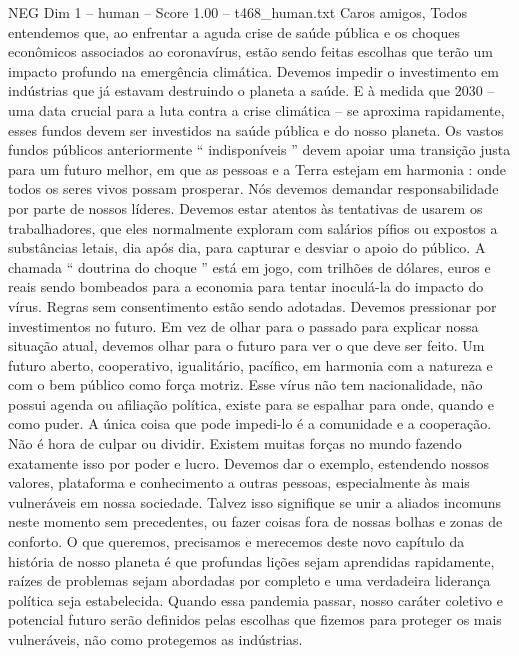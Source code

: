 \begin{textsample}{NEG Dim 1 – human – Score 1.00 – t468\_human.txt}  \label{ex:f1_neg_042}
Caros amigos, Todos entendemos que, ao enfrentar a aguda crise de saúde pública e os choques econômicos associados ao coronavírus, estão sendo feitas escolhas que terão um impacto profundo na emergência climática.
Devemos impedir o investimento em indústrias que já estavam destruindo o planeta a saúde.
E à medida que 2030 – uma data crucial para a luta contra a crise climática – se aproxima rapidamente, esses fundos devem ser investidos na saúde pública e do nosso planeta.
Os vastos fundos públicos anteriormente “ indisponíveis ” devem apoiar uma transição justa para um futuro melhor, em que as pessoas e a Terra estejam em harmonia : onde todos os seres vivos possam prosperar.
Nós devemos demandar responsabilidade por parte de nossos líderes.
Devemos estar atentos às tentativas de usarem os trabalhadores, que eles normalmente exploram com salários pífios ou expostos a substâncias letais, dia após dia, para capturar e desviar o apoio do público.
A chamada “ doutrina do choque ” está em jogo, com trilhões de dólares, euros e reais sendo bombeados para a economia para tentar inoculá-la do impacto do vírus.
Regras sem consentimento estão sendo adotadas.
Devemos pressionar por investimentos no futuro.
Em vez de olhar para o passado para explicar nossa situação atual, devemos olhar para o futuro para ver o que deve ser feito.
Um futuro aberto, cooperativo, igualitário, pacífico, em harmonia com a natureza e com o bem público como força motriz.
Esse vírus não tem nacionalidade, não possui agenda ou afiliação política, existe para se espalhar para onde, quando e como puder.
A única coisa que pode impedi-lo é a comunidade e a cooperação.
Não é hora de culpar ou dividir.
Existem muitas forças no mundo fazendo exatamente isso por poder e lucro.
Devemos dar o exemplo, estendendo nossos valores, plataforma e conhecimento a outras pessoas, especialmente às mais vulneráveis ​​em nossa sociedade.
Talvez isso signifique se unir a aliados incomuns neste momento sem precedentes, ou fazer coisas fora de nossas bolhas e zonas de conforto.
O que queremos, precisamos e merecemos deste novo capítulo da história de nosso planeta é que profundas lições sejam aprendidas rapidamente, raízes de problemas sejam abordadas por completo e uma verdadeira liderança política seja estabelecida.
Quando essa pandemia passar, nosso caráter coletivo e potencial futuro serão definidos pelas escolhas que fizemos para proteger os mais vulneráveis, não como protegemos as indústrias.

\end{textsample}
